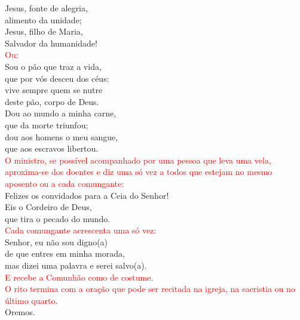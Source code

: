\documentclass{book}
\begin{document}
\begin{flushleft}
    Jesus, fonte de alegria, \\
    alimento da unidade; \\
    Jesus, filho de Maria, \\
    Salvador da humanidade!
    \vspace{.1cm} \\
    \textcolor{red}{Ou:}
    \vspace{.1cm} \\
    Sou o pão que traz a vida, \\
    que por vós desceu dos céus: \\
    vive sempre quem se nutre \\
    deste pão, corpo de Deus.
    \vspace{.1cm} \\
    Dou ao mundo a minha carne, \\
    que da morte triunfou; \\
    dou aos homens o meu sangue, \\
    que aos escravos libertou.
    \vspace{.1cm} \\
    \textcolor{red}{O ministro, se possível acompanhado por uma pessoa que leva uma vela, aproxima-se dos doentes e diz uma só vez a todos que estejam no mesmo aposento ou a cada comungante:}
    \vspace{.1cm} \\
    Felizes os convidados para a Ceia do Senhor! \\
    Eis o Cordeiro de Deus, \\
    que tira o pecado do mundo.
    \vspace{.1cm} \\
    \textcolor{red}{Cada comungante acrescenta uma só vez:}
    \vspace{.1cm} \\
    Senhor, eu não sou digno(a) \\
    de que entres em minha morada, \\
    mas dizei uma palavra e serei salvo(a).
    \vspace{.1cm} \\
    \textcolor{red}{E recebe a Comunhão como de costume.}
    \vspace{.1cm} \\
    \textcolor{red}{O rito termina com a oração que pode ser recitada na igreja, na sacristia ou no último quarto.}
    \vspace{.1cm} \\
    Oremos.

\end{flushleft}
\end{document}
